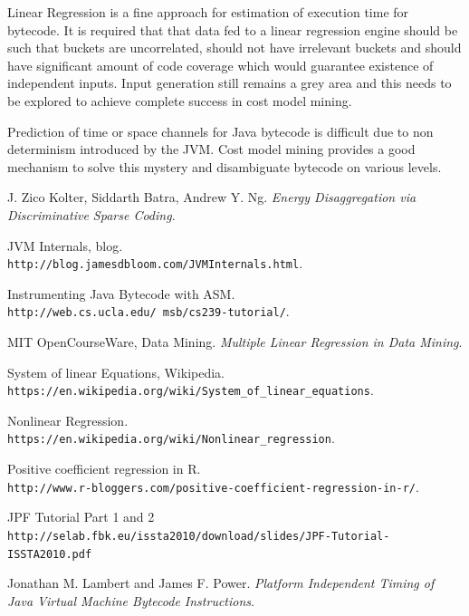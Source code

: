 \documentclass[11pt]{article}
\begin{document}
Linear Regression is a fine approach for estimation of execution time for bytecode. It is required that that data fed to a linear regression engine should be such that  buckets are uncorrelated, should not have irrelevant buckets and should have significant amount of code coverage which would guarantee existence of independent inputs. Input generation still remains a grey area and this needs to be explored to achieve complete success in cost model mining.

Prediction of time or space channels for Java bytecode is difficult due to non determinism introduced by the JVM. Cost model mining provides a good mechanism to solve this mystery and disambiguate bytecode on various levels.

\newpage

\begin{thebibliography}{9}
J. Zico Kolter, Siddarth Batra, Andrew Y. Ng. 
\textit{Energy Disaggregation via Discriminative Sparse Coding}.
 
JVM Internals, blog. \\
\texttt{http://blog.jamesdbloom.com/JVMInternals.html}.

Instrumenting Java Bytecode with ASM. \\ 
\texttt{http://web.cs.ucla.edu/~msb/cs239-tutorial/}.

MIT OpenCourseWare, Data Mining.
\textit{Multiple Linear Regression in Data Mining}.
 
System of linear Equations, Wikipedia.\\
\texttt{https://en.wikipedia.org/wiki/System\_of\_linear\_equations}.

Nonlinear Regression.\\
\texttt{https://en.wikipedia.org/wiki/Nonlinear\_regression}.

Positive coefficient regression in R.\\
\texttt{http://www.r-bloggers.com/positive-coefficient-regression-in-r/}.

JPF Tutorial Part 1 and 2\\
\texttt{http://selab.fbk.eu/issta2010/download/slides/JPF-Tutorial-ISSTA2010.pdf}

Jonathan M. Lambert and James F. Power. 
\textit{Platform Independent Timing of Java Virtual Machine Bytecode Instructions}.
\end{thebibliography}
\end{document}
